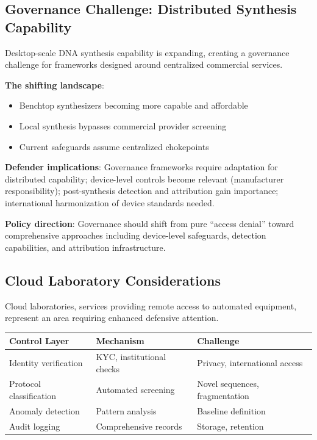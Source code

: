 \documentclass[11pt,letterpaper]{article}
\begin{document}
\subsection{Governance Challenge: Distributed Synthesis Capability}

Desktop-scale DNA synthesis capability is expanding, creating a governance challenge for frameworks designed around centralized commercial services.

\textbf{The shifting landscape}:
\begin{itemize}[nosep]
  \item Benchtop synthesizers becoming more capable and affordable
  \item Local synthesis bypasses commercial provider screening
  \item Current safeguards assume centralized chokepoints
\end{itemize}

\textbf{Defender implications}: Governance frameworks require adaptation for distributed capability; device-level controls become relevant (manufacturer responsibility); post-synthesis detection and attribution gain importance; international harmonization of device standards needed.

\textbf{Policy direction}: Governance should shift from pure ``access denial'' toward comprehensive approaches including device-level safeguards, detection capabilities, and attribution infrastructure.

\subsection{Cloud Laboratory Considerations}

Cloud laboratories, services providing remote access to automated equipment, represent an area requiring enhanced defensive attention.

\begin{center}
\small
\begin{tabular}{L{3cm}L{4.5cm}L{4.5cm}}
\toprule
\textbf{Control Layer} & \textbf{Mechanism} & \textbf{Challenge} \\
\midrule
Identity verification & KYC, institutional checks & Privacy, international access \\
Protocol classification & Automated screening & Novel sequences, fragmentation \\
Anomaly detection & Pattern analysis & Baseline definition \\
Audit logging & Comprehensive records & Storage, retention \\
\bottomrule
\end{tabular}
\end{center}
\end{document}
